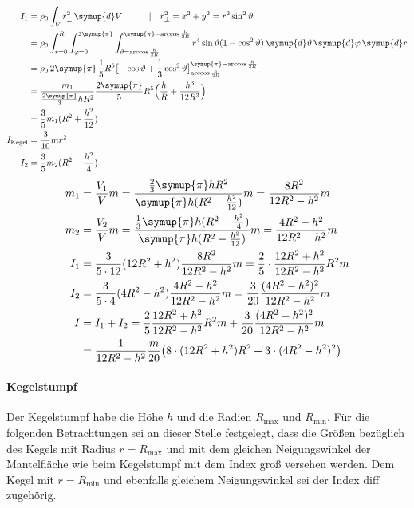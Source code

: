 \begin{align}
    I_1&=\rho _0 \int_V r_{\perp}^2 \, \symup{d}V 
        \quad \quad \quad |\quad r_{\perp}^2=x^2+y^2=r^2\sin ^2\vartheta \\
        &= \rho _0  \int_{r=0}^R \int_{\varphi=0}^{2\symup{\pi}} \int_{\vartheta=\arccos{\frac{h}{2R}}}^{\symup{\pi}-\arccos{\frac{h}{2R}}} 
        r^4\sin{\vartheta}(1-\cos ^2\vartheta) \, \symup{d}\vartheta \, \symup{d}\varphi \, \symup{d}r \\
        &= \rho _0 \, 2\symup{\pi} \, \frac{1}{5} R^5 \bigl[-\cos{\vartheta}+\frac{1}{3}\cos ^2\vartheta\bigr]_{\arccos \frac{h}{2R}}^{\symup{\pi}-\arccos \frac{h}{2R}} \\
        &= \frac{m_1}{\frac{2\symup{\pi}}{3}hR^2} \frac{2\symup{\pi}}{5} R^5 \Bigl(\frac{h}{R} + \frac{h^3}{12R^3}\Bigr) \\
        &= \frac{3}{5}m_1(R^2+\frac{h^2}{12}) \\
    I_\text{Kegel}&=\frac{3}{10}mr^2 \\
    I_2&=\frac{3}{5}m_2(R^2-\frac{h^2}{4}) \\
\end{align}
\begin{align}
    m_1&=\frac{V_1}{V}m=\frac{\frac{2}{3}\symup{\pi}hR^2}{\symup{\pi}h(R^2-\frac{h^2}{12})}m=\frac{8R^2}{12R^2-h^2}m \\
    m_2&=\frac{V_2}{V}m=\frac{\frac{1}{3}\symup{\pi}h(R^2-\frac{h^2}{4})}{\symup{\pi}h(R^2-\frac{h^2}{12})}m=\frac{4R^2-h^2}{12R^2-h^2}m \\
    I_1&=\frac{3}{5\cdot12}(12R^2+h^2)\frac{8R^2}{12R^2-h^2}m=\frac{2}{5}\cdot \frac{12R^2+h^2}{12R^2-h^2}R^2m \\
    I_2&=\frac{3}{5\cdot4}(4R^2-h^2)\frac{4R^2-h^2}{12R^2-h^2}m=\frac{3}{20}\frac{(4R^2-h^2)^2}{12R^2-h^2}m \\
    I&=I_1+I_2=\frac{2}{5}\frac{12R^2+h^2}{12R^2-h^2}R^2m+\frac{3}{20}\frac{(4R^2-h^2)^2}{12R^2-h^2}m \\
        &= \frac{1}{12R^2-h^2}\frac{m}{20}\bigl(8\cdot(12R^2+h^2)R^2+3\cdot(4R^2-h^2)^2\bigr) 
\end{align}

\paragraph{Kegelstumpf}

Der Kegelstumpf habe die Höhe $h$ und die Radien $R_\text{max}$ und $R_\text{min}$. 
Für die folgenden Betrachtungen sei an dieser Stelle festgelegt, dass die Größen bezüglich des Kegels mit Radius ${r=R_\text{max}}$
und mit dem gleichen Neigungswinkel der Mantelfläche wie beim Kegelstumpf mit dem Index \glqq groß\grqq{} versehen werden. 
Dem Kegel mit ${r=R_\text{min}}$ und ebenfalls gleichem Neigungswinkel sei der Index \glqq diff\grqq{} zugehörig. 

